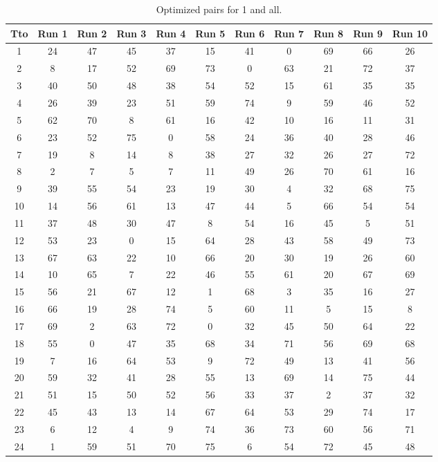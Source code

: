 \begin{table}
  \centering
  \scriptsize
  \caption{Optimized pairs for 1 and all.}
  \label{tab_pairs}
\begin{tabular}{c c c c c c c c c c c }
\hline
Tto & Run 1 & Run 2 & Run 3 & Run 4 & Run 5 & Run 6 & Run 7 & Run 8 & Run 9 & Run 10 \\
\hline
1 & 24 & 47 & 45 & 37 & 15 & 41 & 0 & 69 & 66 & 26 \\
2 & 8 & 17 & 52 & 69 & 73 & 0 & 63 & 21 & 72 & 37 \\
3 & 40 & 50 & 48 & 38 & 54 & 52 & 15 & 61 & 35 & 35 \\
4 & 26 & 39 & 23 & 51 & 59 & 74 & 9 & 59 & 46 & 52 \\
5 & 62 & 70 & 8 & 61 & 16 & 42 & 10 & 16 & 11 & 31 \\
6 & 23 & 52 & 75 & 0 & 58 & 24 & 36 & 40 & 28 & 46 \\
7 & 19 & 8 & 14 & 8 & 38 & 27 & 32 & 26 & 27 & 72 \\
8 & 2 & 7 & 5 & 7 & 11 & 49 & 26 & 70 & 61 & 16 \\
9 & 39 & 55 & 54 & 23 & 19 & 30 & 4 & 32 & 68 & 75 \\
10 & 14 & 56 & 61 & 13 & 47 & 44 & 5 & 66 & 54 & 54 \\
11 & 37 & 48 & 30 & 47 & 8 & 54 & 16 & 45 & 5 & 51 \\
12 & 53 & 23 & 0 & 15 & 64 & 28 & 43 & 58 & 49 & 73 \\
13 & 67 & 63 & 22 & 10 & 66 & 20 & 30 & 19 & 26 & 60 \\
14 & 10 & 65 & 7 & 22 & 46 & 55 & 61 & 20 & 67 & 69 \\
15 & 56 & 21 & 67 & 12 & 1 & 68 & 3 & 35 & 16 & 27 \\
16 & 66 & 19 & 28 & 74 & 5 & 60 & 11 & 5 & 15 & 8 \\
17 & 69 & 2 & 63 & 72 & 0 & 32 & 45 & 50 & 64 & 22 \\
18 & 55 & 0 & 47 & 35 & 68 & 34 & 71 & 56 & 69 & 68 \\
19 & 7 & 16 & 64 & 53 & 9 & 72 & 49 & 13 & 41 & 56 \\
20 & 59 & 32 & 41 & 28 & 55 & 13 & 69 & 14 & 75 & 44 \\
21 & 51 & 15 & 50 & 52 & 56 & 33 & 37 & 2 & 37 & 32 \\
22 & 45 & 43 & 13 & 14 & 67 & 64 & 53 & 29 & 74 & 17 \\
23 & 6 & 12 & 4 & 9 & 74 & 36 & 73 & 60 & 56 & 71 \\
24 & 1 & 59 & 51 & 70 & 75 & 6 & 54 & 72 & 45 & 48 \\

\end{tabular}
\end{table}
